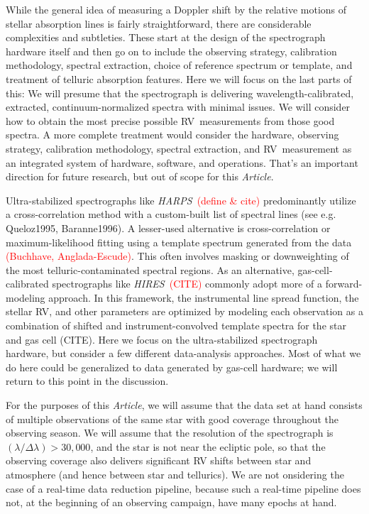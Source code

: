 \documentclass[modern]{aastex62}
\newcommand{\documentname}{\textsl{Article}}
\newcommand{\todo}[1]{\textcolor{red}{#1}}  %
\newcommand{\acronym}[1]{{\small{#1}}}
\newcommand{\project}[1]{\textsl{#1}}
\newcommand{\HARPS}{\project{\acronym{HARPS}}}
\newcommand{\HIRES}{\project{\acronym{HIRES}}}
\newcommand{\RV}{\acronym{RV}}
\begin{document}
While the general idea of measuring a Doppler shift by the relative
motions of stellar absorption lines is fairly straightforward, there
are considerable complexities and subtleties.
These start at the design of the spectrograph hardware itself
and then go on to include 
the observing strategy, calibration methodology, spectral extraction,
choice of reference spectrum or template, and treatment of telluric absorption
features.
Here we will focus on the last parts of this: We will presume that the
spectrograph is delivering wavelength-calibrated, extracted, continuum-normalized
spectra with minimal issues.
We will consider how to obtain the most
precise possible \RV\ measurements from those good spectra.
A more complete treatment would consider the hardware, observing strategy,
calibration methodology, spectral extraction, and \RV\ measurement as
an integrated system of hardware, software, and operations.
That's an important direction for future research, but out of scope for this \documentname.

Ultra-stabilized spectrographs like \HARPS\ \todo{(define \& cite)}
predominantly utilize a cross-correlation method with a custom-built
list of spectral lines (see e.g. Queloz1995, Baranne1996).
A lesser-used alternative is cross-correlation or maximum-likelihood
fitting using a template spectrum generated from the data \todo{(Buchhave,
Anglada-Escude)}.
This often involves masking or downweighting of the most
telluric-contaminated spectral regions.
As an alternative, gas-cell-calibrated spectrographs like
\HIRES\ \todo{(CITE)} commonly adopt more of a forward-modeling approach.
In this framework, the instrumental line spread function, the stellar
RV, and other parameters are optimized by modeling each observation as
a combination of shifted and instrument-convolved template spectra for
the star and gas cell (CITE).
Here we focus on the ultra-stabilized spectrograph hardware, but consider
a few different data-analysis approaches.
Most of what we do here could be generalized to data generated by
gas-cell hardware; we will return to this point in the discussion.

For the purposes of this \documentname, we will assume that the data
set at hand consists of multiple observations of the same star with
good coverage throughout the observing season.
We will assume that the resolution of the spectrograph is $(\lambda /
\Delta\lambda) > 30,000$, and the star is not near the ecliptic pole,
so that the observing coverage also delivers significant RV shifts
between star and atmosphere (and hence between star and tellurics).
We are not onsidering the case of a real-time data reduction pipeline,
because such a real-time pipeline does not, at the beginning of an
observing campaign, have many epochs at hand.
\end{document}
